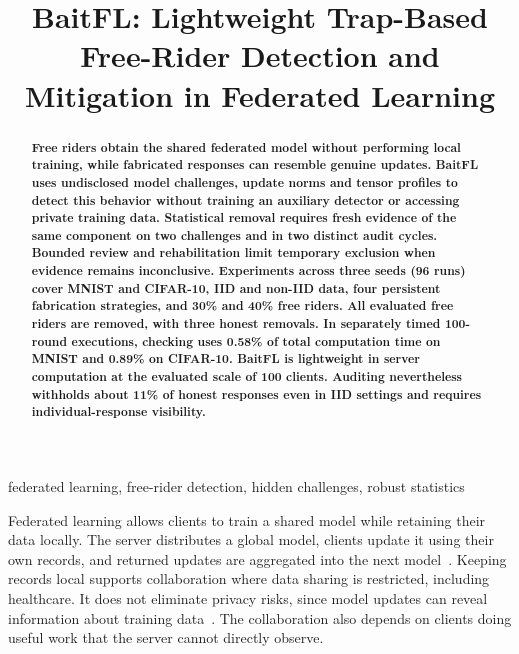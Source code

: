 \documentclass[conference]{IEEEtran}
\title{BaitFL: Lightweight Trap-Based Free-Rider Detection and Mitigation in Federated Learning}
\author{\IEEEauthorblockN{Aashnan Rahman}
\IEEEauthorblockA{Department of Computer Science and Engineering\\Islamic University of Technology}}
\makeatletter
\renewcommand{\section}{\@startsection{section}{1}{\z@}{1.5ex}{0.7ex}{\normalfont\normalsize\centering\scshape}}
\makeatother
\begin{document}
\maketitle
\raggedbottom
\setlength{\parskip}{0pt plus 2pt minus 0.5pt}
\makeatletter{}\makeatother
\setlength{\abovedisplayskip}{6pt plus 1pt minus 1pt}
\setlength{\belowdisplayskip}{6pt plus 1pt minus 1pt}
\begin{abstract}\bfseries
Free riders obtain the shared federated model without performing local
training, while fabricated responses can resemble genuine updates.
BaitFL uses undisclosed model challenges, update norms and tensor profiles
to detect this behavior without training an auxiliary detector or accessing
private training data. Statistical removal requires fresh evidence of the
same component on two challenges and in two distinct audit cycles.
Bounded review and rehabilitation limit temporary exclusion when evidence
remains inconclusive. Experiments across three seeds (96 runs) cover MNIST and CIFAR-10,
IID and non-IID data, four persistent fabrication strategies, and 30\%
and 40\% free riders. All evaluated free riders are removed, with three
honest removals. In separately timed 100-round executions, checking uses
0.58\% of total computation time on MNIST and 0.89\% on CIFAR-10.
BaitFL is lightweight in server computation at the evaluated scale of
100 clients. Auditing nevertheless withholds about 11\% of honest
responses even in IID settings and requires individual-response visibility.
\end{abstract}
\begin{IEEEkeywords}
federated learning, free-rider detection, hidden challenges, robust statistics
\end{IEEEkeywords}

\section{Introduction}
Federated learning allows clients to train a shared model while retaining
their data locally. The server distributes a global model, clients update
it using their own records, and returned updates are aggregated into the
next model~\cite{mcmahan2017communication}. Keeping records local supports
collaboration where data sharing is restricted, including healthcare.
It does not eliminate privacy risks, since model updates can reveal
information about training data~\cite{kairouz2021advances,melis2019leakage}.
The collaboration also depends on clients doing useful work that the
server cannot directly observe.
\end{document}
